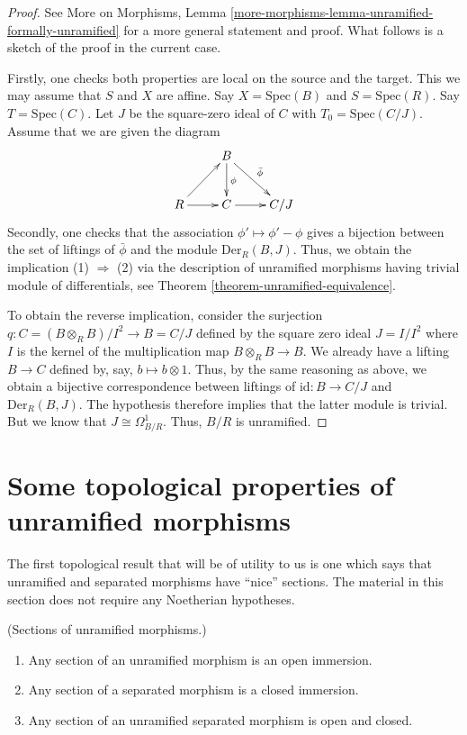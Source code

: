\begin{proof}
See More on Morphisms,
Lemma \ref{more-morphisms-lemma-unramified-formally-unramified}
for a more general statement and proof.
What follows is a sketch of the proof in the current case.

\medskip\noindent
Firstly, one checks both properties are local on the source and the target.
This we may assume that $S$ and $X$ are affine.
Say $X = \text{Spec}(B)$ and $S = \text{Spec}(R)$.
Say $T = \text{Spec}(C)$. Let $J$ be the square-zero ideal of $C$
with $T_0 = \text{Spec}(C/J)$. Assume that we are given the diagram
$$
\xymatrix{
& B \ar[d]^\phi \ar[rd]^{\bar{\phi}}	
& \\
R \ar[r] \ar[ur] & C \ar[r]						
& C/J
}
$$
Secondly, one checks that the association $\phi' \mapsto \phi' - \phi$
gives a bijection between the set of liftings of $\bar{\phi}$ and the module
$\text{Der}_R(B, J)$. Thus, we obtain the implication (1) $\Rightarrow$ (2)
via the description of unramified morphisms having trivial module
of differentials, see Theorem \ref{theorem-unramified-equivalence}.

\medskip\noindent
To obtain the reverse implication, consider the surjection
$q : C = (B \otimes_R B)/I^2 \to B = C/J$ defined by the square zero ideal
$J = I/I^2$ where $I$ is the kernel of the multiplication map
$B \otimes_R B \to B$. We already have a lifting $B \to C$ defined by, say,
$b \mapsto b \otimes 1$. Thus, by the same reasoning as above, we obtain a
bijective correspondence between liftings of $\mathrm{id} : B \to C/J$ and
$\text{Der}_R(B, J)$. The hypothesis therefore implies that the latter module is
trivial. But we know that $J \cong \Omega^1_{B/R}$. Thus, $B/R$ is unramified.
\end{proof}

\section{Some topological properties of unramified morphisms}
\label{section-topological-unramified}

\noindent
The first topological result that will be of utility to us is one which says
that unramified and separated morphisms have ``nice'' sections.
The material in this section does not require any Noetherian hypotheses.

\begin{proposition}
\label{proposition-properties-sections}
(Sections of unramified morphisms.)
\begin{enumerate}
\item Any section of an unramified morphism is an open immersion.
\item Any section of a separated morphism is a closed immersion.
\item Any section of an unramified separated morphism is open and closed.
\end{enumerate}
\end{proposition}

